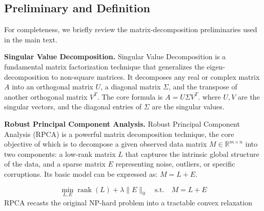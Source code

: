 \subsection{Preliminary and Definition}
\label{sec:preliminaries}
For completeness, we briefly review the matrix-decomposition preliminaries used in the main text.

\noindent\textbf{Singular Value Decomposition.} Singular Value Decomposition is a fundamental matrix factorization technique that generalizes the eigen-decomposition to non-square matrices\cite{SVD}. It decomposes any real or complex matrix $A$ into an orthogonal matrix $U$, a diagonal matrix $\Sigma$, and the transpose of another orthogonal matrix $V^T$. The core formula is $A = U \Sigma V^T$.
where $U,V$ are the singular vectors, and the diagonal entries of $\Sigma$ are the singular values. 

\noindent\textbf{Robust Principal Component Analysis.} Robust Principal Component Analysis (RPCA) is a powerful matrix decomposition technique\cite{RPCA}, the core objective of which is to decompose a given observed data matrix $M \in \mathbb{R}^{m \times n}$ into two components: a low-rank matrix $L$ that captures the intrinsic global structure of the data, and a sparse matrix $E$ representing noise, outliers, or specific corruptions. Its basic model can be expressed as: $M=L+E$.

\begin{equation}
    \min_{L, E} \operatorname{rank}(L) + \lambda \|E\|_0 \quad \text{s.t.} \quad M = L + E \label{eq:RPCA-origin}
\end{equation}
RPCA recasts the original NP-hard problem into a tractable convex relaxation

